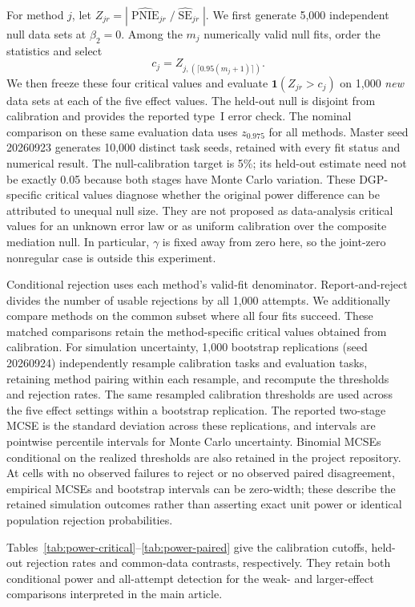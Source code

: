For method $j$, let $Z_{jr}=|\widehat{\operatorname{PNIE}}_{jr}/\widehat{\operatorname{SE}}_{jr}|$. We first generate 5,000 independent null data sets at $\beta_2=0$. Among the $m_j$ numerically valid null fits, order the statistics and select
\[
c_j=Z_{j,(\lceil0.95(m_j+1)\rceil)}.
\]
We then freeze these four critical values and evaluate $\mathbf1(Z_{jr}>c_j)$ on 1,000 \emph{new} data sets at each of the five effect values. The held-out null is disjoint from calibration and provides the reported type~I error check. The nominal comparison on these same evaluation data uses $z_{0.975}$ for all methods. Master seed 20260923 generates 10,000 distinct task seeds, retained with every fit status and numerical result. The null-calibration target is 5\%; its held-out estimate need not be exactly 0.05 because both stages have Monte Carlo variation. These DGP-specific critical values diagnose whether the original power difference can be attributed to unequal null size. They are not proposed as data-analysis critical values for an unknown error law or as uniform calibration over the composite mediation null. In particular, $\gamma$ is fixed away from zero here, so the joint-zero nonregular case is outside this experiment.

Conditional rejection uses each method's valid-fit denominator. Report-and-reject divides the number of usable rejections by all 1,000 attempts. We additionally compare methods on the common subset where all four fits succeed. These matched comparisons retain the method-specific critical values obtained from calibration. For simulation uncertainty, 1,000 bootstrap replications (seed 20260924) independently resample calibration tasks and evaluation tasks, retaining method pairing within each resample, and recompute the thresholds and rejection rates. The same resampled calibration thresholds are used across the five effect settings within a bootstrap replication. The reported two-stage MCSE is the standard deviation across these replications, and intervals are pointwise percentile intervals for Monte Carlo uncertainty. Binomial MCSEs conditional on the realized thresholds are also retained in the project repository. At cells with no observed failures to reject or no observed paired disagreement, empirical MCSEs and bootstrap intervals can be zero-width; these describe the retained simulation outcomes rather than asserting exact unit power or identical population rejection probabilities.

Tables~\ref{tab:power-critical}--\ref{tab:power-paired} give the calibration cutoffs, held-out rejection rates and common-data contrasts, respectively. They retain both conditional power and all-attempt detection for the weak- and larger-effect comparisons interpreted in the main article.


